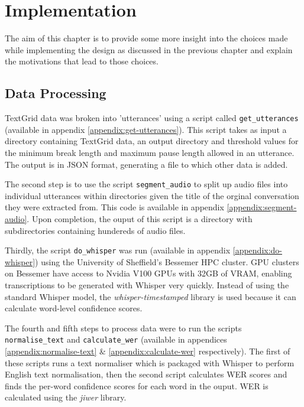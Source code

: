 \chapter{Implementation}\label{ch:implementation-and-testing}

The aim of this chapter is to provide some more insight into the choices made while implementing the design as discussed in the previous chapter and explain the motivations that lead to those choices.

\section{Data Processing}

TextGrid data was broken into 'utterances' using a script called \texttt{get\_utterances} (available in appendix \ref{appendix:get-utterances}).
This script takes as input a directory containing TextGrid data, an output directory and threshold values for the minimum break length and maximum pause length allowed in an utterance.
The output is in JSON format, generating a file to which other data is added.

The second step is to use the script \texttt{segment\_audio} to split up audio files into individual utterances within directories given the title of the orginal conversation they were extracted from.
This code is available in appendix \ref{appendix:segment-audio}.
Upon completion, the ouput of this script is a directory with subdirectories containing hundereds of audio files.

Thirdly, the script \texttt{do\_whisper} was run (available in appendix \ref{appendix:do-whisper}) using the University of Sheffield's Bessemer HPC cluster\cite{shef-hpc}.
GPU clusters on Bessemer have access to Nvidia V100 GPUs with 32GB of VRAM, enabling transcriptions to be generated with Whisper very quickly.
Instead of using the standard Whisper model, the \emph{whisper-timestamped} library is used because it can calculate word-level confidence scores.

The fourth and fifth steps to process data were to run the scripts \texttt{normalise\_text} and \texttt{calculate\_wer} (available in appendices \ref{appendix:normalise-text} \& \ref{appendix:calculate-wer} respectively).
The first of these scripts runs a text normaliser which is packaged with Whisper\cite{whisper} to perform English text normalisation, then the second script calculates WER scores and finds the per-word confidence scores for each word in the ouput.
WER is calculated using the \emph{jiwer}\cite{jiwer} library.


